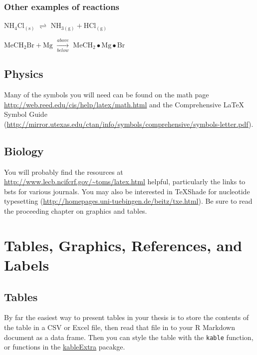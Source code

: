 \documentclass[ms]{uncgdissertationexp}
\theoremstyle{plain}
\theoremstyle{definition}
\theoremstyle{remark}
\begin{document}
  \subsection{Other examples of
  reactions}\label{other-examples-of-reactions}
  
  \(\mathrm{NH_4Cl_{(s)}}\) \(\rightleftharpoons\)
  \(\mathrm{NH_{3(g)}+HCl_{(g)}}\)
  
  \noindent \(\mathrm{MeCH_2Br + Mg}\) \(\xrightarrow[below]{above}\)
  \(\mathrm{MeCH_2\bullet Mg \bullet Br}\)
  
  \section{Physics}\label{physics}
  
  Many of the symbols you will need can be found on the math page
  \url{http://web.reed.edu/cis/help/latex/math.html} and the Comprehensive
  LaTeX Symbol Guide
  (\url{http://mirror.utexas.edu/ctan/info/symbols/comprehensive/symbols-letter.pdf}).
  
  \section{Biology}\label{biology}
  
  You will probably find the resources at
  \url{http://www.lecb.ncifcrf.gov/~toms/latex.html} helpful, particularly
  the links to bsts for various journals. You may also be interested in
  TeXShade for nucleotide typesetting
  (\url{http://homepages.uni-tuebingen.de/beitz/txe.html}). Be sure to
  read the proceeding chapter on graphics and tables.
  
  \chapter{Tables, Graphics, References, and Labels}\label{ref-labels}
  
  \section{Tables}\label{tables}
  
  By far the easiest way to present tables in your thesis is to store the
  contents of the table in a CSV or Excel file, then read that file in to
  your R Markdown document as a data frame. Then you can style the table
  with the \texttt{kable} function, or functions in the
  \href{https://cran.r-project.org/web/packages/kableExtra/index.html}{kableExtra}
  pacakge.
  
\end{document}
